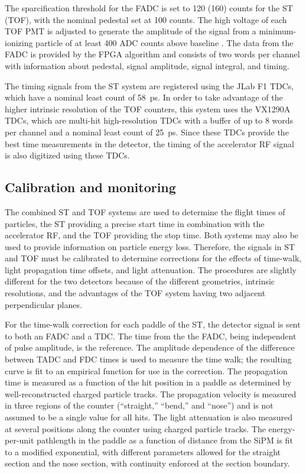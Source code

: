 The sparcification threshold for the FADC is set to 120 (160) counts for the ST (TOF), with the nominal pedestal set at 100 counts. The high voltage of each TOF PMT is adjusted to generate the amplitude of the signal from a minimum-ionizing particle of at least 400 ADC counts above baseline . The data from the FADC is provided by the FPGA algorithm and consists
of two words per channel with information about pedestal, signal amplitude, signal integral, and timing.

The timing signals from the ST system are registered using the JLab F1 TDCs, which have a nominal least count of 58~ps. In order to take advantage of the higher intrinsic resolution of the TOF counters, this system uses the VX1290A TDCs, which are multi-hit high-resolution TDCs with a buffer of up to 8 words per channel and a nominal least count of 25~ps. Since these TDCs provide the best time measurements in the \gx{} detector, the timing of the accelerator RF signal is also
digitized using these TDCs.

\subsection{Calibration and monitoring \label{sec:sccalib}}
The combined ST and TOF systems are used to determine the flight times of particles, the ST providing a precise start time in combination with the accelerator RF, and the TOF providing the stop time. Both systems may also be used to provide information on particle energy loss. Therefore, the signals in ST and TOF must be 
calibrated to determine corrections for the effects of
time-walk, light propagation time offsets, and light attenuation. The procedures are slightly different for the two detectors because of the different geometries, intrinsic resolutions, and the advantages of the TOF system having two adjacent perpendicular planes. 

For the time-walk correction for each paddle of the ST, the detector signal is sent to both an FADC and a TDC. The time from the the FADC, being independent of pulse amplitude, is the reference. The amplitude dependence of the difference between TADC and FDC times is used to measure the time walk; the resulting curve is fit to an empirical function for use in the correction. The propagation time is measured as a function of the hit position in a paddle as determined by well-reconstructed charged particle tracks. The propagation velocity is measured in three regions of the counter (``straight,'' ``bend,'' and ``nose'') and is not assumed to be a single value for all hits. The light attenuation is also measured at several positions along the counter using charged particle tracks. The energy-per-unit pathlength in the paddle as a function of distance from the SiPM is fit to a modified exponential, with different parameters allowed for the straight section and the nose section, with continuity enforced at the section boundary.

